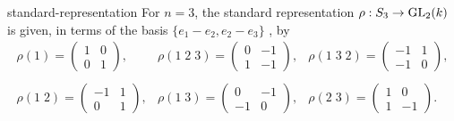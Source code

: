 \begin{example}{standard-representation}
    For $n = 3$, the standard representation $\rho : S_3 \to \textup{GL}_2(k)$ is given, in terms of the basis $\{ e_1 - e_2, e_2 - e_3 \}$ , by
    \[ \begin{array}{ccc}
        \rho(1) = \begin{pmatrix} 1 & 0 \\ 0 & 1 \end{pmatrix}, &
        \rho(1 \; 2 \; 3) = \begin{pmatrix} 0 & -1 \\ 1 & -1 \end{pmatrix}, &
        \rho(1 \; 3 \; 2) = \begin{pmatrix} -1 & 1 \\ -1 & 0 \end{pmatrix}, \\ & & \\
        \rho(1 \; 2) = \begin{pmatrix} -1 & 1 \\ 0 & 1 \end{pmatrix}, &
        \rho(1 \; 3) = \begin{pmatrix} 0 & -1 \\ -1 & 0 \end{pmatrix}, &
        \rho(2 \; 3) = \begin{pmatrix} 1 & 0 \\ 1 & -1 \end{pmatrix} .
    \end{array} \]
\end{example}
